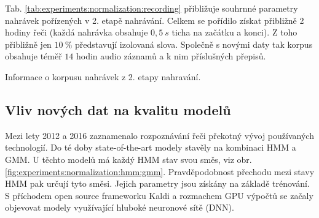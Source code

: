 Tab. \ref{tab:experiments:normalization:recording} přibližuje souhrnné parametry nahrávek pořízených v 2. etapě nahrávání. Celkem se pořídilo získat přibližně 2 hodiny řeči (každá nahrávka obsahuje $0,5\ s$ ticha na začátku a konci). Z toho přibližně jen $10\ \%$ představují izolovaná slova. Společně s novými daty tak korpus obsahuje téměř $14$ hodin audio záznamů a k nim příslušných přepisů.

\begin{table}[htpb]
  \centering
  \def\arraystretch{1.5}
  \caption{Informace o korpusu nahrávek z 2. etapy nahravání.}
  \label{tab:experiments:normalization:recording}
\end{table}

\subsection{Vliv nových dat na kvalitu modelů}
\label{chap:experiments:normalization:quality}

Mezi lety 2012 a 2016 zaznamenalo rozpoznávání řeči překotný vývoj používaných technologií. Do té doby state-of-the-art modely stavěly na kombinaci HMM a  GMM. U těchto modelů má každý HMM stav svou směs, viz obr. \ref{fig:experiments:normalization:hmm:gmm}. Pravděpodobnost přechodu mezi stavy HMM pak určují tyto směsi. Jejich parametry jsou získány na základě trénování. S příchodem open source frameworku Kaldi \cite{Kaldi2011} a rozmachem GPU výpočtů se začaly objevovat modely využívající hluboké neuronové sítě (DNN).

